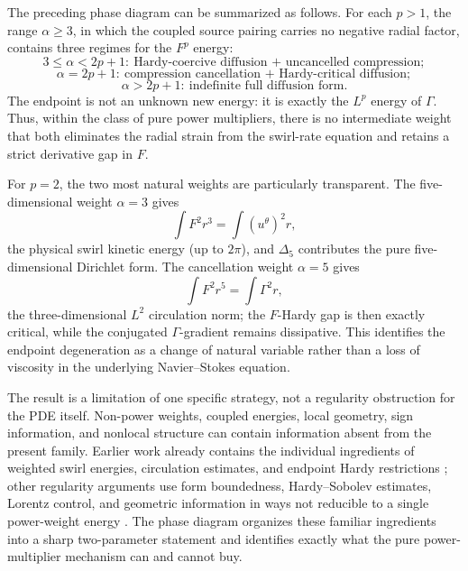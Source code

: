 \documentclass[11pt]{article}
\numberwithin{equation}{section}
\theoremstyle{remark}
\newcommand{\Da}{\Delta_5}
\begin{document}
The preceding phase diagram can be summarized as follows.  For each \(p>1\), the range \(\alpha\ge3\), in which the coupled source pairing carries no negative radial factor, contains three regimes for the \(F^p\) energy:
\[
 \boxed{
 3\le\alpha<2p+1:
 \ \text{Hardy-coercive diffusion + uncancelled compression};}
\]
\[
 \boxed{
 \alpha=2p+1:
 \ \text{compression cancellation + Hardy-critical diffusion};}
\]
\[
 \boxed{
 \alpha>2p+1:
 \ \text{indefinite full diffusion form}.}
\]
The endpoint is not an unknown new energy: it is exactly the \(L^p\) energy of \(\Gamma\).  Thus, within the class of pure power multipliers, there is no intermediate weight that both eliminates the radial strain from the swirl-rate equation and retains a strict derivative gap in \(F\).

For \(p=2\), the two most natural weights are particularly transparent.  The five-dimensional weight \(\alpha=3\) gives
\[
 \int F^2r^3=\int (u^\theta)^2r,
\]
the physical swirl kinetic energy (up to \(2\pi\)), and \(\Da\) contributes the pure five-dimensional Dirichlet form.  The cancellation weight \(\alpha=5\) gives
\[
 \int F^2r^5=\int\Gamma^2r,
\]
the three-dimensional \(L^2\) circulation norm; the \(F\)-Hardy gap is then exactly critical, while the conjugated \(\Gamma\)-gradient remains dissipative.  This identifies the endpoint degeneration as a change of natural variable rather than a loss of viscosity in the underlying Navier--Stokes equation.

The result is a limitation of one specific strategy, not a regularity obstruction for the PDE itself.  Non-power weights, coupled energies, local geometry, sign information, and nonlocal structure can contain information absent from the present family.  Earlier work already contains the individual ingredients of weighted swirl energies, circulation estimates, and endpoint Hardy restrictions \cite{ChaeLee2002,ChenFangZhang2017,RencZaj2019}; other regularity arguments use form boundedness, Hardy--Sobolev estimates, Lorentz control, and geometric information in ways not reducible to a single power-weight energy \cite{LeiZhang2017,Zhang2017,WangHuangWeiYu2024}.  The phase diagram organizes these familiar ingredients into a sharp two-parameter statement and identifies exactly what the pure power-multiplier mechanism can and cannot buy.
\end{document}
